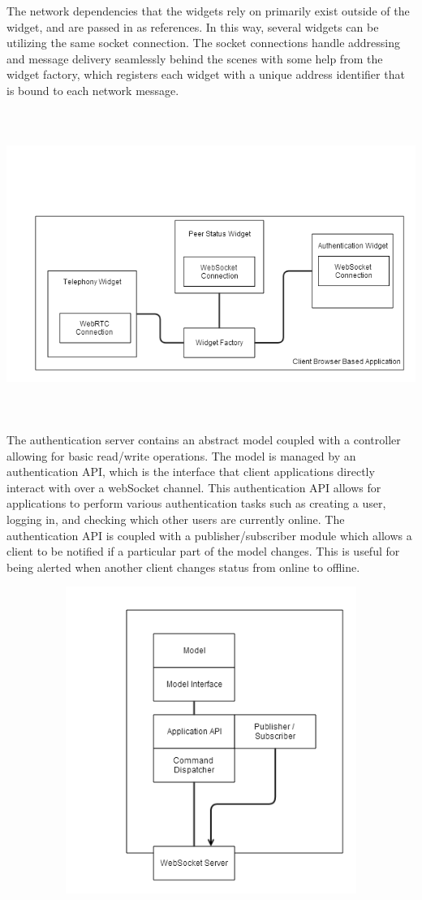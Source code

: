 \documentclass[a4paper,12pt]{report}
\begin{document}
The network dependencies that the widgets rely on primarily exist outside of the widget, and are passed in as references. In this way, several widgets can be utilizing the same socket connection. The socket connections handle addressing and message delivery seamlessly behind the scenes with some help from the widget factory, which registers each widget with a unique address identifier that is bound to each network message.

\includegraphics[width=16cm,height=10cm]{WidgetStructure}

The authentication server contains an abstract model coupled with a controller allowing for basic read/write operations. The model is managed by an authentication API, which is the interface that client applications directly interact with over a webSocket channel. This authentication API allows for applications to perform various authentication tasks such as creating a user, logging in, and checking which other users are currently online. The authentication API is coupled with a publisher/subscriber module which allows a client to be notified if a particular part of the model changes. This is useful for being alerted when another client changes status from online to offline.

\includegraphics[width=16cm,height=10cm]{AuthServerOverview}
\end{document}
